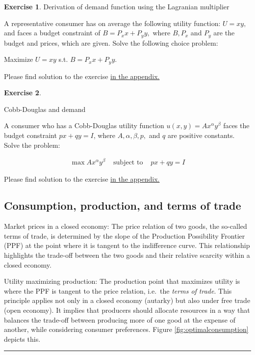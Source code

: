 \documentclass[
  12pt,
  oneside]{book}
\theoremstyle{definition}
\theoremstyle{definition}
\theoremstyle{definition}
\newtheorem{exercise}{Exercise}[chapter]
\theoremstyle{definition}
\theoremstyle{remark}
\begin{document}
\begin{exercise}
\protect\hypertarget{exr:derofdemand}{}\label{exr:derofdemand}Derivation of demand function using the Lagranian multiplier

A representative consumer has on average the following utility function:
\(U=x y,\) and faces a budget constraint of \(B=P_{x} x+P_{y} y,\) where \(B, P_{x}\)
and \(P_{y}\) are the budget and prices, which are given. Solve the following choice problem:

Maximize \(U=x y\) s.t. \(B=P_{x} x+P_{y} y\).

Please find solution to the exercise \hyperref[sol:derofdemand]{in the appendix.}
\end{exercise}

\begin{exercise}
\protect\hypertarget{exr:cdanddemand}{}\label{exr:cdanddemand}

Cobb-Douglas and demand

A consumer who has a Cobb-Douglas utility function \(u(x, y)=A x^{\alpha} y^{\beta}\)
faces the budget constraint \(p x+q y=I\), where \(A, \alpha, \beta, p,\) and \(q\) are
positive constants.
Solve the problem:

\[
\begin{array}{lll}
\max A x^{\alpha} y^{\beta} & \text { subject to } & p x+q y=I
\end{array}
\]

Please find solution to the exercise \hyperref[sol:cdanddemand]{in the appendix.}

\subsection{Consumption, production, and terms of trade}\label{consumption-production-and-terms-of-trade}

Market prices in a closed economy:
The price relation of two goods, the so-called terms of trade, is determined by the slope of the Production Possibility Frontier (PPF) at the point where it is tangent to the indifference curve. This relationship highlights the trade-off between the two goods and their relative scarcity within a closed economy.

Utility maximizing production:
The production point that maximizes utility is where the PPF is tangent to the price relation, i.e.~the \emph{terms of trade}. This principle applies not only in a closed economy (autarky) but also under free trade (open economy). It implies that producers should allocate resources in a way that balances the trade-off between producing more of one good at the expense of another, while considering consumer preferences. Figure \ref{fig:optimalconsumption} depicts this.

\begin{center}\rule{0.5\linewidth}{0.5pt}\end{center}

\end{exercise}
\end{document}
